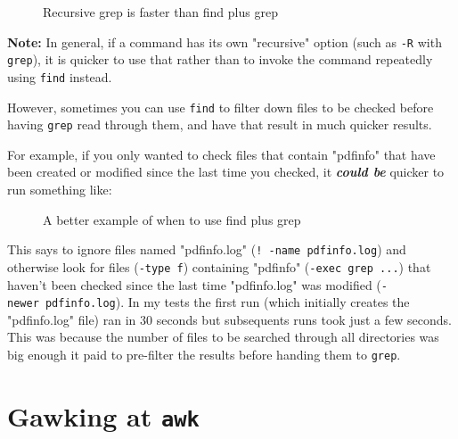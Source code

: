 \documentclass[10pt,american,]{book}
\makeatletter
\newenvironment{Shaded}{\begin{snugshade}}{\end{snugshade}}
\newcommand{\KeywordTok}[1]{\textcolor[rgb]{0.13,0.29,0.53}{\textbf{{#1}}}}
\newcommand{\DataTypeTok}[1]{\textcolor[rgb]{0.13,0.29,0.53}{{#1}}}
\newcommand{\NormalTok}[1]{{#1}}
\numberwithin{figure}{chapter}
\DeclareRobustCommand{\drcap}[1]{\begin{figure}[H]\caption{#1}\end{figure}}
\DeclareRobustCommand{\drcmd}[1]{\index{Commands!#1@\texttt{#1}}}
\renewcommand{\KeywordTok}[1]{{#1}}
\renewcommand{\DataTypeTok}[1]{{#1}}
\renewcommand{\NormalTok}[1]{{#1}}
\makeatother
\begin{document}
\drcap{Recursive grep is faster than find plus grep}

\begin{Shaded}
\end{Shaded}

\textbf{Note:} In general, if a command has its own "recursive" option
(such as \texttt{-R} with \texttt{grep}), it is quicker to use that
rather than to invoke the command repeatedly using
\texttt{find}\drcmd{find} instead.

However, sometimes you can use \texttt{find} to filter down files to be
checked before having \texttt{grep} read through them, and have that
result in much quicker results.

For example, if you only wanted to check files that contain "pdfinfo"
that have been created or modified since the last time you checked, it
\textbf{\emph{could be}} quicker to run something like:

\drcap{A better example of when to use find plus grep}

\begin{Shaded}
\end{Shaded}

This says to ignore files named "pdfinfo.log"
(\texttt{!\ -name\ pdfinfo.log}) and otherwise look for files
(\texttt{-type\ f}) containing "pdfinfo" (\texttt{-exec\ grep\ ...})
that haven't been checked since the last time "pdfinfo.log" was modified
(\texttt{-newer\ pdfinfo.log}). In my tests the first run (which
initially creates the "pdfinfo.log" file) ran in 30 seconds but
subsequents runs took just a few seconds. This was because the number of
files to be searched through all directories was big enough it paid to
pre-filter the results before handing them to \texttt{grep}.

\section{\texorpdfstring{Gawking at
\texttt{awk}}{Gawking at awk}}\label{gawking-at-awk}
\end{document}
